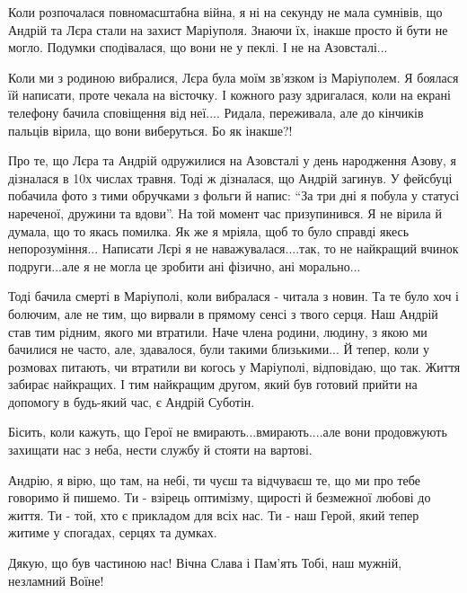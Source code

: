 Коли розпочалася повномасштабна війна, я ні на секунду не мала сумнівів, що
Андрій та Лєра стали на захист Маріуполя. Знаючи їх, інакше просто й бути не
могло. Подумки сподівалася, що вони не у пеклі. І не на Азовсталі...

Коли ми з родиною вибралися, Лєра була моїм зв'язком із Маріуполем. Я боялася
їй написати, проте чекала на вісточку. І кожного разу здригалася, коли на
екрані телефону бачила сповіщення від неї.... Ридала, переживала, але до
кінчиків пальців вірила, що вони виберуться. Бо як інакше?!

Про те, що Лєра та Андрій одружилися на Азовсталі у день народження Азову, я
дізналася в 10х числах травня. Тоді ж дізналася, що Андрій загинув. У фейсбуці
побачила фото з тими обручками з фольги й напис: \enquote{За три дні я побула у статусі
нареченої, дружини та вдови}. На той момент час призупинився. Я не вірила й
думала, що то якась помилка. Як же я мріяла, щоб то було справді якесь
непорозуміння... Написати Лєрі я не наважувалася....так, то не найкращий вчинок
подруги...але я не могла це зробити ані фізично, ані морально... 

Тоді  бачила смерті в Маріуполі, коли вибралася - читала з новин. Та те було
хоч і болючим, але не тим, що вирвали в прямому сенсі з твого серця.  Наш
Андрій став тим рідним, якого ми втратили. Наче члена родини, людину, з якою ми
бачилися не часто, але, здавалося, були такими близькими... Й тепер, коли у
розмовах питають, чи втратили ви когось у Маріуполі, відповідаю, що так. Життя
забирає найкращих. І тим найкращим другом, який був готовий прийти на допомогу
в будь-який час, є Андрій Суботін. 

Бісить, коли кажуть, що Герої не вмирають...вмирають....але вони продовжують
захищати нас з неба, нести службу й стояти на вартові. 

Андрію, я вірю, що там, на небі, ти чуєш та відчуваєш те, що ми про тебе
говоримо й пишемо. Ти - взірець оптимізму, щирості й безмежної любові до життя.
Ти - той, хто є прикладом для всіх нас. Ти - наш Герой,  який тепер житиме у
спогадах, серцях та думках.

Дякую, що був частиною нас! Вічна Слава і Пам'ять Тобі, наш мужній, незламний
Воїне!

